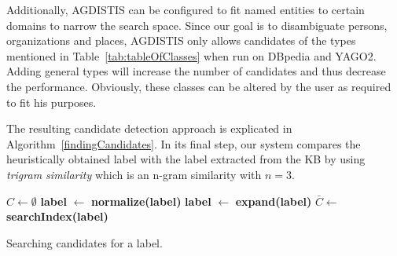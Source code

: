  
Additionally, AGDISTIS can be configured to fit named entities to certain domains to narrow the search space.
Since our goal is to disambiguate persons, organizations and places, AGDISTIS only allows candidates of the types mentioned in Table~\ref{tab:tableOfClasses} when run on DBpedia and YAGO2.
Adding general types will increase the number of candidates and thus decrease the performance.
Obviously, these classes can be altered by the user as required to fit his purposes. 




The resulting candidate detection approach is explicated in Algorithm~\ref{findingCandidates}.
In its final step, our system compares the heuristically obtained label with the label extracted from the \ac{KB} by using \emph{trigram similarity} which is an n-gram similarity with $n=3$. 

\begin{algorithm}[htb!]
$C \longleftarrow \emptyset$\;
{\bf label } $\longleftarrow$ {\bf normalize(label)}\;
{\bf label } $\longleftarrow$ {\bf expand(label)}\;
$ \displaystyle \bar C \longleftarrow$ {\bf searchIndex(label)}\;
\For{{\bf c} $\in \bar C$}{
    \If{$\neg${\bf c .matches([0-9]$^+$)}}{
        \If{{\bf trigramSimilarity(c, label)}$ \geq \sigma$}{
            \If{{\bf fitDomain(c)}} {
                $C \longleftarrow C \cup $ {\bf c}\;
            }
        }
    }
}
\caption{Searching candidates for a label.}
\label{findingCandidates}
\end{algorithm}

